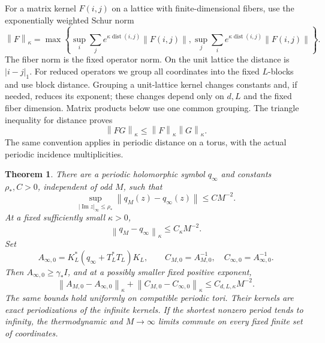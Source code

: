 \documentclass[11pt]{article}
\newtheorem{theorem}{Theorem}[section]
\theoremstyle{remark}
\newcommand{\norm}[1]{\left\|#1\right\|}
\begin{document}
For a matrix kernel $F(i,j)$ on a lattice with finite-dimensional fibers,
use the exponentially weighted Schur norm
\begin{equation}\label{limit-schur-definition}
 \norm{F}_\kappa=
 \max\left\{
 \sup_i\sum_j e^{\kappa\operatorname{dist}(i,j)}\norm{F(i,j)},
 \sup_j\sum_i e^{\kappa\operatorname{dist}(i,j)}\norm{F(i,j)}
 \right\}.
\end{equation}
The fiber norm is the fixed operator norm. On the unit lattice the
distance is $|i-j|_1$. For reduced operators we group all coordinates
into the fixed $L$-blocks and use block distance. Grouping a unit-lattice
kernel changes constants and, if needed, reduces its exponent; these
changes depend only on $d,L$ and the fixed fiber dimension. Matrix
products below use one common grouping. The triangle inequality for
distance proves
\begin{equation}\label{limit-schur-algebra}
 \norm{FG}_\kappa\le\norm{F}_\kappa\norm{G}_\kappa.
\end{equation}
The same convention applies in periodic distance on a torus, with the
actual periodic incidence multiplicities.

\begin{theorem}\label{limit-theorem}
There are a periodic holomorphic symbol $q_\infty$ and constants
$\rho_*,C>0$, independent of odd $M$, such that
\begin{equation}\label{limit-symbol-rate}
 \sup_{|\operatorname{Im}z|_\infty\le\rho_*}
       \norm{q_M(z)-q_\infty(z)}\le CM^{-2}.
\end{equation}
At a fixed sufficiently small $\kappa>0$,
\begin{equation}\label{limit-action-rate}
 \norm{q_M-q_\infty}_\kappa\le C_\kappa M^{-2}.
\end{equation}
Set
\[
 A_{\infty,0}=K_L^*(q_\infty+T_L^*T_L)K_L,
 \qquad C_{M,0}=A_{M,0}^{-1},\quad
 C_{\infty,0}=A_{\infty,0}^{-1}.
\]
Then $A_{\infty,0}\ge\gamma_*I$, and at a possibly smaller fixed
positive exponent,
\begin{equation}\label{limit-covariance-rate}
 \norm{A_{M,0}-A_{\infty,0}}_\kappa+
 \norm{C_{M,0}-C_{\infty,0}}_\kappa
 \le C_{d,L,\kappa}M^{-2}.
\end{equation}
The same bounds hold uniformly on compatible periodic tori. Their
kernels are exact periodizations of the infinite kernels. If the
shortest nonzero period tends to infinity, the thermodynamic and
$M\to\infty$ limits commute on every fixed finite set of coordinates.
\end{theorem}
\end{document}
